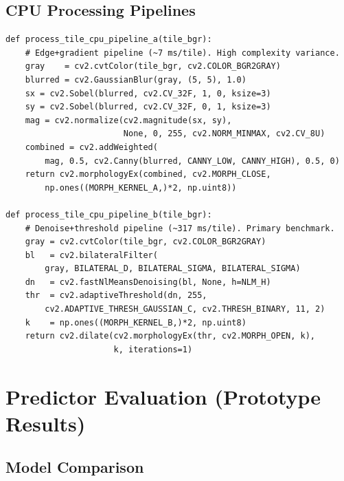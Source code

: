 \documentclass[12pt,a4paper]{article}
\begin{document}
\subsection{CPU Processing Pipelines}

\begin{lstlisting}[caption={CPU pipelines A and B (\texttt{src/worker\_cpu.py}).}, label=lst:pipelines]
def process_tile_cpu_pipeline_a(tile_bgr):
    # Edge+gradient pipeline (~7 ms/tile). High complexity variance.
    gray    = cv2.cvtColor(tile_bgr, cv2.COLOR_BGR2GRAY)
    blurred = cv2.GaussianBlur(gray, (5, 5), 1.0)
    sx = cv2.Sobel(blurred, cv2.CV_32F, 1, 0, ksize=3)
    sy = cv2.Sobel(blurred, cv2.CV_32F, 0, 1, ksize=3)
    mag = cv2.normalize(cv2.magnitude(sx, sy),
                        None, 0, 255, cv2.NORM_MINMAX, cv2.CV_8U)
    combined = cv2.addWeighted(
        mag, 0.5, cv2.Canny(blurred, CANNY_LOW, CANNY_HIGH), 0.5, 0)
    return cv2.morphologyEx(combined, cv2.MORPH_CLOSE,
        np.ones((MORPH_KERNEL_A,)*2, np.uint8))

def process_tile_cpu_pipeline_b(tile_bgr):
    # Denoise+threshold pipeline (~317 ms/tile). Primary benchmark.
    gray = cv2.cvtColor(tile_bgr, cv2.COLOR_BGR2GRAY)
    bl   = cv2.bilateralFilter(
        gray, BILATERAL_D, BILATERAL_SIGMA, BILATERAL_SIGMA)
    dn   = cv2.fastNlMeansDenoising(bl, None, h=NLM_H)
    thr  = cv2.adaptiveThreshold(dn, 255,
        cv2.ADAPTIVE_THRESH_GAUSSIAN_C, cv2.THRESH_BINARY, 11, 2)
    k    = np.ones((MORPH_KERNEL_B,)*2, np.uint8)
    return cv2.dilate(cv2.morphologyEx(thr, cv2.MORPH_OPEN, k),
                      k, iterations=1)
\end{lstlisting}

\section{Predictor Evaluation (Prototype Results)}

\subsection{Model Comparison}
\end{document}
